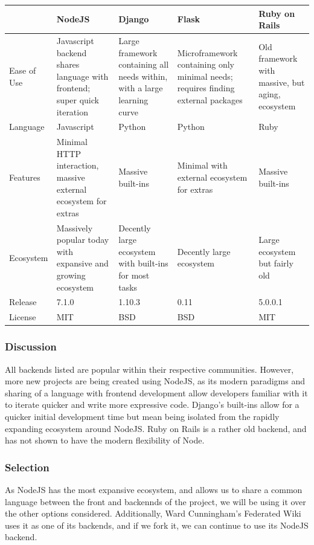 \documentclass[onecolumn, draftclsnofoot,10pt, compsoc]{IEEEtran}
\begin{document}
{\tablehead{}
\begin{supertabular}{|p{2.5cm}|p{3.3cm}|p{3.3cm}|p{3.3cm}|p{3.3cm}|}
\hline
	& NodeJS
	& Django
	& Flask
	& Ruby on Rails \\
\hline
	Ease of Use
	& Javascript backend shares language with frontend; super quick iteration
	& Large framework containing all needs within, with a large learning curve
	& Microframework containing only minimal needs; requires finding external packages
	& Old framework with massive, but aging, ecosystem \\
\hline
	Language
	& Javascript
	& Python
	& Python
	& Ruby \\
\hline
	Features
	& Minimal HTTP interaction, massive external ecosystem for extras
	& Massive built-ins
	& Minimal with external ecosystem for extras
	& Massive built-ins \\
\hline
	Ecosystem
	& Massively popular today with expansive and growing ecosystem
	& Decently large ecosystem with built-ins for most tasks
	& Decently large ecosystem
	& Large ecosystem but fairly old \\
\hline
	Release
	& 7.1.0
	& 1.10.3
	& 0.11
	& 5.0.0.1 \\
\hline
	License
	& MIT
	& BSD
	& BSD
	& MIT \\
\hline
\end{supertabular}

\medskip

\subsubsection{Discussion}
{\noindent
All backends listed are popular within their respective communities. However, more new projects are being created using NodeJS, as its modern paradigms and sharing of a language with frontend development allow developers familiar with it to iterate quicker and write more expressive code. Django's built-ins allow for a quicker initial development time but mean being isolated from the rapidly expanding ecosystem around NodeJS.
Ruby on Rails is a rather old backend, and has not shown to have the modern flexibility of Node.
 \par}

\medskip
\subsubsection{Selection}
{\noindent As NodeJS has the most expansive ecosystem, and allows us to share a common language between the front and backennds of the project, we will be using it over the other options considered. Additionally, Ward Cunningham's Federated Wiki uses it as one of its backends, and if we fork it, we can continue to use its NodeJS backend. \par}







}
\end{document}
